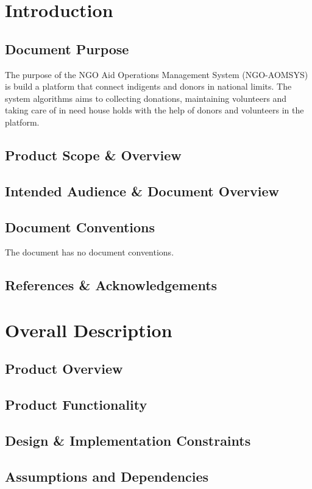 \documentclass{report}
\begin{document}
	\chapter{Introduction}
		\section{Document Purpose}
  
                 The purpose of the NGO Aid Operations Management System (NGO-AOMSYS) is build a platform that connect indigents and donors in national limits.
                 The system algorithms aims to collecting donations, maintaining volunteers and taking care of in need house holds with the help of donors and 
                 volunteers in the platform.
		 
		\section{Product Scope \& Overview}
		\section{Intended Audience \& Document Overview}
		\section{Document Conventions}
			The document has no document conventions.
		\section{References \& Acknowledgements}
	\chapter{Overall Description}
		\section{Product Overview}
		\section{Product Functionality}
		\section{Design \& Implementation Constraints}
		\section{Assumptions and Dependencies}
\end{document}
